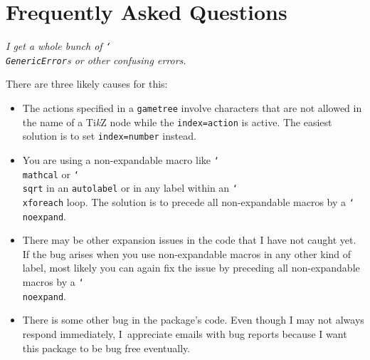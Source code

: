 \documentclass{article}
\renewcommand{\textbackslash}{\char`\\}
\def\cmd#1{\texttt{\color{cmd}\textbackslash#1}}
\def\TikZ{Ti\emph{k}Z\xspace}
\def\question{\bigskip\noindent\itshape}
\def\answer{\bigskip\noindent\normalshape}
\begin{document}

\section{Frequently Asked Questions}
\vskip-3mm

\question I get a whole bunch of \texttt{\textbackslash GenericError}s or other confusing errors.

\answer There are three likely causes for this:
\begin{itemize}
\item The actions specified in a \texttt{gametree} involve characters that are not allowed in the name of a \TikZ node while the \texttt{index=action} is active. The easiest solution is to set \texttt{index=number} instead. 
\item You are using a non-expandable macro like \cmd{mathcal} or \cmd{sqrt} in an \texttt{autolabel} or in any label within an \cmd{xforeach} loop. The solution is to precede all non-expandable macros by a \cmd{noexpand}. %
\item There may be other expansion issues in the code that I have not caught yet. If the bug arises when you use non-expandable macros in any other kind of label, most likely you can again fix the issue by preceding all non-expandable macros by a \cmd{noexpand}.
\item There is some other bug in the package's code. Even though I may not always respond immediately, I~appreciate emails with bug reports because I want this package to be bug free eventually. 
\end{itemize}
\end{document}
